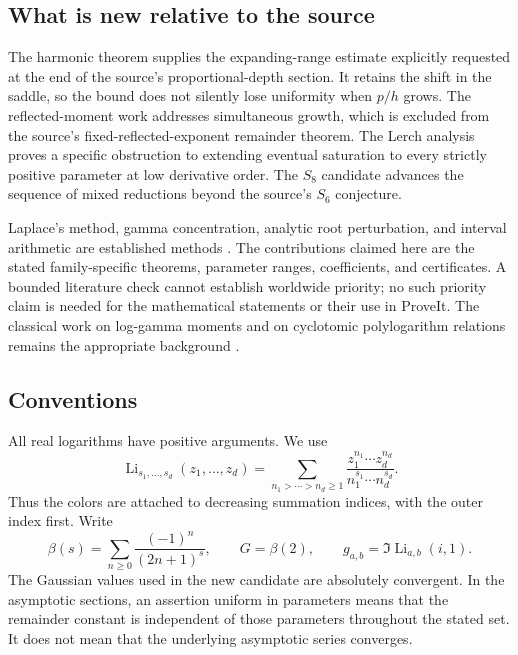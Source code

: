 \documentclass[11pt,letterpaper]{article}
\numberwithin{equation}{section}
\theoremstyle{plain}
\theoremstyle{definition}
\theoremstyle{remark}
\DeclareMathOperator{\Li}{Li}
\begin{document}
\subsection{What is new relative to the source}
The harmonic theorem supplies the expanding-range estimate explicitly
requested at the end of the source's proportional-depth section. It
retains the shift in the saddle, so the bound does not silently lose
uniformity when \(p/h\) grows. The reflected-moment work addresses
simultaneous growth, which is excluded from the source's
fixed-reflected-exponent remainder theorem. The Lerch analysis proves a
specific obstruction to extending eventual saturation to every
strictly positive parameter at low derivative order. The \(S_8\)
candidate advances the sequence of mixed reductions beyond the source's
\(S_6\) conjecture.

Laplace's method, gamma concentration, analytic root perturbation, and
interval arithmetic are established methods \cite{DLMF23,TemmeUniform}.
The contributions claimed here are the stated family-specific theorems,
parameter ranges, coefficients, and certificates. A bounded literature
check cannot establish worldwide priority; no such priority claim is
needed for the mathematical statements or their use in ProveIt.
The classical work on log-gamma moments and on cyclotomic polylogarithm
relations remains the appropriate background
\cite{ACEMKM,Zhao2008,Coffey}.

\subsection{Conventions}
All real logarithms have positive arguments. We use
\[
 \Li_{s_1,\ldots,s_d}(z_1,\ldots,z_d)
 =\sum_{n_1>\cdots>n_d\geq1}
   \frac{z_1^{n_1}\cdots z_d^{n_d}}
        {n_1^{s_1}\cdots n_d^{s_d}}.
\]
Thus the colors are attached to decreasing summation indices, with
the outer index first. Write
\[
 \beta(s)=\sum_{n\geq0}\frac{(-1)^n}{(2n+1)^s},\qquad
 G=\beta(2),\qquad
 g_{a,b}=\Im\Li_{a,b}(i,1).
\]
The Gaussian values used in the new candidate are absolutely convergent.
In the asymptotic sections, an assertion uniform in parameters means
that the remainder constant is independent of those parameters
throughout the stated set. It does not mean that the underlying
asymptotic series converges.







\end{document}
